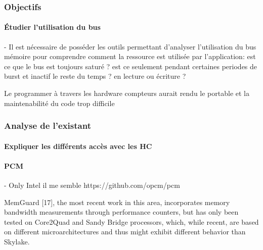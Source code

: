     \subsubsection{Objectifs}


        \paragraph{Étudier l'utilisation du bus}
        - Il est nécessaire de posséder les outils permettant d'analyser l'utilisation du bus mémoire pour comprendre comment la ressource est utilisée par l'application: est ce que le bus est toujours saturé ? est ce seulement pendant certaines periodes de burst et inactif le reste du temps ? en lecture ou écriture ?

Le programmer à travers les hardware compteurs aurait rendu le portable et la maintenabilité du code trop difficile













        














    \subsubsection{Analyse de l'existant}
    
    \paragraph{Expliquer les différents accès avec les HC}
    
    \paragraph{PCM}
    - Only Intel il me semble https://github.com/opcm/pcm

MemGuard [17], the most recent work in this area, incorporates memory bandwidth measurements through performance
counters, but has only been tested on Core2Quad and Sandy Bridge
processors, which, while recent, are based on different microarchitectures and thus might exhibit different behavior than Skylake.


